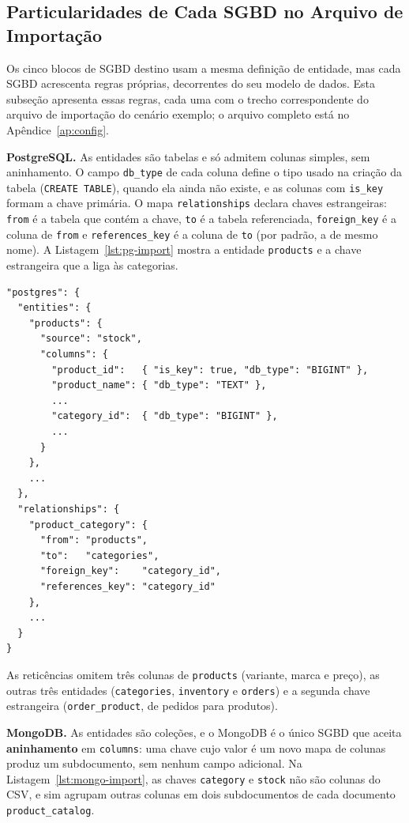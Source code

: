 \subsection{Particularidades de Cada SGBD no Arquivo de Importação}
\label{sec:importacao-por-sgbd}

Os cinco blocos de SGBD destino usam a mesma definição de entidade, mas cada SGBD acrescenta
regras próprias, decorrentes do seu modelo de dados. Esta subseção apresenta essas regras,
cada uma com o trecho correspondente do arquivo de importação do cenário exemplo; o arquivo
completo está no Apêndice~\ref{ap:config}.

\textbf{PostgreSQL.} As entidades são tabelas e só admitem colunas simples, sem
aninhamento. O campo \texttt{db\_type} de cada coluna define o tipo usado na criação da
tabela (\texttt{CREATE TABLE}), quando ela ainda não existe, e as colunas
com \texttt{is\_key} formam a chave primária. O mapa \texttt{relationships} declara chaves
estrangeiras: \texttt{from} é a tabela que contém a chave, \texttt{to} é a tabela
referenciada, \texttt{foreign\_key} é a coluna de \texttt{from} e \texttt{references\_key}
é a coluna de \texttt{to} (por padrão, a de mesmo nome). A
Listagem~\ref{lst:pg-import} mostra a entidade \texttt{products} e a chave estrangeira que
a liga às categorias.

\begin{lstlisting}[style=jsonstyle,caption={Fragmento de importação PostgreSQL com chave estrangeira.},label={lst:pg-import}]
"postgres": {
  "entities": {
    "products": {
      "source": "stock",
      "columns": {
        "product_id":   { "is_key": true, "db_type": "BIGINT" },
        "product_name": { "db_type": "TEXT" },
        ...
        "category_id":  { "db_type": "BIGINT" },
        ...
      }
    },
    ...
  },
  "relationships": {
    "product_category": {
      "from": "products",
      "to":   "categories",
      "foreign_key":    "category_id",
      "references_key": "category_id"
    },
    ...
  }
}
\end{lstlisting}

As reticências omitem três colunas de \texttt{products} (variante, marca e preço), as
outras três entidades (\texttt{categories}, \texttt{inventory} e \texttt{orders}) e a
segunda chave estrangeira (\texttt{order\_product}, de pedidos para produtos).

\textbf{MongoDB.} As entidades são coleções, e o MongoDB é o único SGBD que aceita
\textbf{aninhamento} em \texttt{columns}: uma chave cujo valor é um novo mapa de colunas
produz um subdocumento, sem nenhum campo adicional. Na Listagem~\ref{lst:mongo-import}, as
chaves \texttt{category} e \texttt{stock} não são colunas do CSV, e sim agrupam outras
colunas em dois subdocumentos de cada documento \texttt{product\_catalog}.

